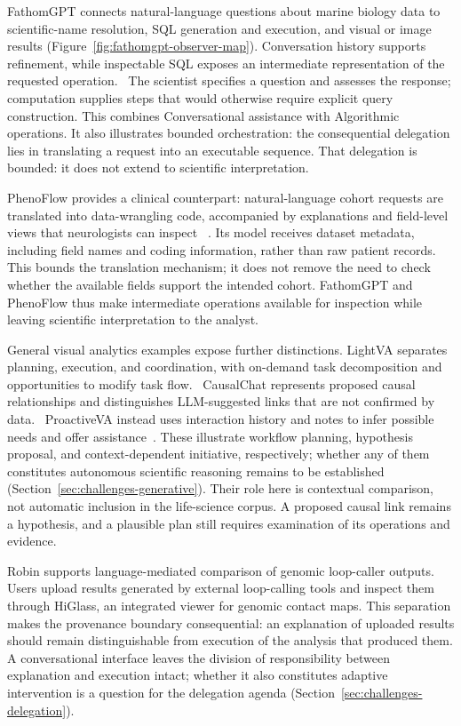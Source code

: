 FathomGPT connects natural-language questions about marine biology data to scientific-name resolution, SQL generation and execution, and visual or image results (Figure~\ref{fig:fathomgpt-observer-map}). Conversation history supports refinement, while inspectable SQL exposes an intermediate representation of the requested operation.~\cite{AnchorFathomGPT} The scientist specifies a question and assesses the response; computation supplies steps that would otherwise require explicit query construction. This combines Conversational assistance with Algorithmic operations. It also illustrates bounded orchestration: the consequential delegation lies in translating a request into an executable sequence. That delegation is bounded: it does not extend to scientific interpretation.



PhenoFlow provides a clinical counterpart: natural-language cohort requests are translated into data-wrangling code, accompanied by explanations and field-level views that neurologists can inspect ~\cite{EvalKim2025}. Its model receives dataset metadata, including field names and coding information, rather than raw patient records. This bounds the translation mechanism; it does not remove the need to check whether the available fields support the intended cohort. FathomGPT and PhenoFlow thus make intermediate operations available for inspection while leaving scientific interpretation to the analyst.

General visual analytics examples expose further distinctions. LightVA separates planning, execution, and coordination, with on-demand task decomposition and opportunities to modify task flow.~\cite{LightVA} CausalChat represents proposed causal relationships and distinguishes LLM-suggested links that are not confirmed by data.~\cite{CausalChat} ProactiveVA instead uses interaction history and notes to infer possible needs and offer assistance~\cite{EvalZhao2025}. These illustrate workflow planning, hypothesis proposal, and context-dependent initiative, respectively; whether any of them constitutes autonomous scientific reasoning remains to be established (Section~\ref{sec:challenges-generative}). Their role here is contextual comparison, not automatic inclusion in the life-science corpus. A proposed causal link remains a hypothesis, and a plausible plan still requires examination of its operations and evidence.

Robin supports language-mediated comparison of genomic loop-caller outputs.~\cite{ExpansionX018} Users upload results generated by external loop-calling tools and inspect them through HiGlass, an integrated viewer for genomic contact maps. This separation makes the provenance boundary consequential: an explanation of uploaded results should remain distinguishable from execution of the analysis that produced them. A conversational interface leaves the division of responsibility between explanation and execution intact; whether it also constitutes adaptive intervention is a question for the delegation agenda (Section~\ref{sec:challenges-delegation}).

